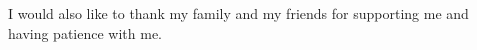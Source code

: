 \documentclass[11pt,twoside,a4paper]{book}
\begin{document}
I would also like to thank my family and my friends for supporting me and having
patience with me.

\cleardoublepage

\thispagestyle{empty}

\pagestyle{headings}
\tableofcontents
\mainmatter



%



\end{document}
